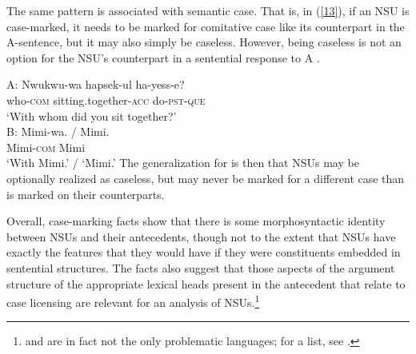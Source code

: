 The same pattern is associated with semantic case. That is, in (\ref{13}), if an NSU is case-marked, it needs
to be marked for comitative case like its counterpart in the A-sentence, but it may also simply be caseless. However,  
being caseless is not an option for the NSU's counterpart in a sentential response to A \citep{Kim2015}.

\ea
A:
\gll Nwukwu-wa          hapsek-ul                     ha-yess-e?\\
     who-\textsc{com}   sitting.together-\textsc{acc} do-\textsc{pst}-\textsc{que}\\
\glt  `With whom did you sit together?'\\

B:
\gll Mimi-wa. 			/ Mimi.\\
     Mimi-\textsc{com} {} Mimi\\
\glt `With Mimi.' / `Mimi.' \label{13}\z
%
The generalization for  is then that NSUs may be optionally realized as caseless, but may never be marked for a different case than is marked on their counterparts.

Overall, case-marking facts show that there is some morphosyntactic identity between NSUs and their antecedents, though not to the extent that NSUs have exactly the features that they would have if they were constituents embedded in sentential structures. The  facts also suggest that those aspects of the argument structure of the appropriate lexical heads present in the antecedent that relate to case licensing are relevant for an analysis of NSUs.\footnote{ and  are in fact not the only problematic languages; for a list, see \citet{Vicente2015}.}

